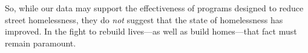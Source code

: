 \documentclass[11pt]{article}
\begin{document}
So, while our data may support the effectiveness of programs designed to reduce street homelessness, 
they do {\it not} suggest that the state of homelessness has improved. In the fight to rebuild lives---as well 
as build homes---that fact must remain paramount.\\

\clearpage

%


%
%
%


\end{document}
